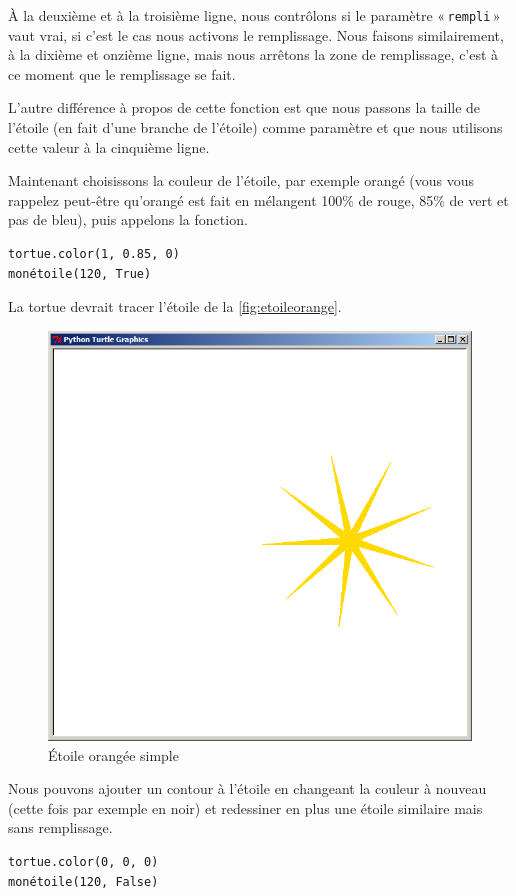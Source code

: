 À la deuxième et à la troisième ligne, nous contrôlons si le paramètre « \texttt{rempli} » vaut vrai, si c'est le cas nous activons le remplissage. Nous faisons similairement, à la dixième et onzième ligne, mais nous arrêtons la zone de remplissage, c'est à ce moment que le remplissage se fait.

L'autre différence à propos de cette fonction est que nous passons la taille de l'étoile (en fait d'une branche de l'étoile) comme paramètre et que nous utilisons cette valeur à la cinquième ligne.

Maintenant choisissons la couleur de l'étoile, par exemple orangé (vous vous rappelez peut-être qu'orangé est fait en mélangent 100\% de rouge, 85\% de vert et pas de bleu), puis appelons la fonction.

\begin{Verbatim}[frame=single,rulecolor=\color{mbleu}, label=à taper]
tortue.color(1, 0.85, 0)
monétoile(120, True)
\end{Verbatim}

La tortue devrait tracer l'étoile de la \autoref{fig:etoileorange}.
\begin{figure}[h!]
\centering
\includegraphics[scale=0.4]{images/etoileorange}
\caption{Étoile orangée simple}\label{fig:etoileorange}
\end{figure}

Nous pouvons ajouter un contour à l'étoile en changeant la couleur à nouveau (cette fois par exemple en noir) et redessiner en plus une étoile similaire mais sans remplissage.
\begin{Verbatim}[frame=single,rulecolor=\color{mbleu}, label=à taper]
tortue.color(0, 0, 0)
monétoile(120, False)
\end{Verbatim}

